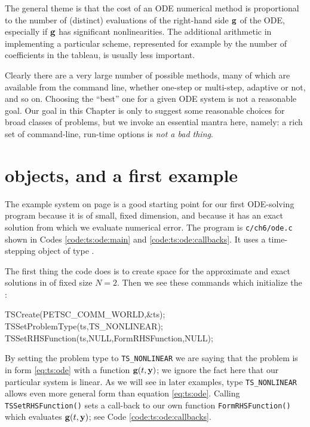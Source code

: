 The general theme is that the cost of an ODE numerical method is proportional to the number of (distinct) evaluations of the right-hand side $\mathbf{g}$ of the ODE, especially if $\mathbf{g}$ has significant nonlinearities.  The additional arithmetic in implementing a particular scheme, represented for example by the number of coefficients in the tableau, is usually less important.

Clearly there are a very large number of possible methods, many of which are available from the \PETSc command line, whether one-step or multi-step, adaptive or not, and so on.   Choosing the ``best'' one for a given ODE system is not a reasonable goal.  Our goal in this Chapter is only to suggest some reasonable choices for broad classes of problems, but we invoke an essential \PETSc mantra here, namely: a rich set of command-line, run-time options is \emph{not a bad thing}.

\section{\PETSc \pTS objects, and a first example}  The example system on page \pageref{ex:ts:odeeasy} is a good starting point for our first ODE-solving program because it is of small, fixed dimension, and because it has an exact solution from which we evaluate numerical error.  The program is \texttt{c/ch6/ode.c} shown in Codes \ref{code:ts:ode:main} and \ref{code:ts:ode:callbacks}.  It uses a \PETSc time-stepping object of type \pTS.


The first thing the code does is to create space for the approximate and exact solutions in \pVecs of fixed size $N=2$.  Then we see these commands which initialize the \pTS:
\begin{code}
  TSCreate(PETSC_COMM_WORLD,&ts);
  TSSetProblemType(ts,TS_NONLINEAR);
  TSSetRHSFunction(ts,NULL,FormRHSFunction,NULL);
\end{code}
By setting the problem type to \texttt{TS\_NONLINEAR} we are saying that the problem is in form \eqref{eq:ts:ode} with a function $\mathbf{g}(t,\mathbf{y})$; we ignore the fact here that our particular system is linear.  As we will see in later examples, type \texttt{TS\_NONLINEAR} allows even more general form than equation \eqref{eq:ts:ode}.  Calling \texttt{TSSetRHSFunction()} sets a call-back to our own function \texttt{FormRHSFunction()} which evaluates $\mathbf{g}(t,\mathbf{y})$; see Code \ref{code:ts:ode:callbacks}.

